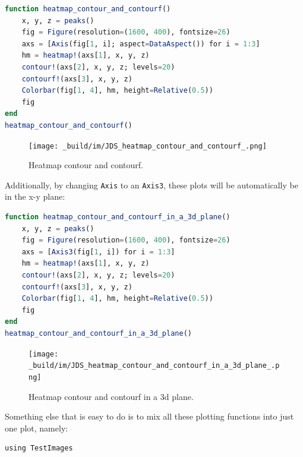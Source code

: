 \documentclass[
  notoc %
]{tufte-book}
\newcommand{\passthrough}[1]{#1}
\begin{document}
\begin{lstlisting}[language=Julia]
function heatmap_contour_and_contourf()
    x, y, z = peaks()
    fig = Figure(resolution=(1600, 400), fontsize=26)
    axs = [Axis(fig[1, i]; aspect=DataAspect()) for i = 1:3]
    hm = heatmap!(axs[1], x, y, z)
    contour!(axs[2], x, y, z; levels=20)
    contourf!(axs[3], x, y, z)
    Colorbar(fig[1, 4], hm, height=Relative(0.5))
    fig
end
heatmap_contour_and_contourf()
\end{lstlisting}

\begin{figure}
\hypertarget{fig:heatmap_contour_and_contourf}{%
\centering
\texttt{[image: \_build/im/JDS\_heatmap\_contour\_and\_contourf\_.png]}
\caption{Heatmap contour and
contourf.}\label{fig:heatmap_contour_and_contourf}
}
\end{figure}

Additionally, by changing \passthrough{\lstinline!Axis!} to an
\passthrough{\lstinline!Axis3!}, these plots will be automatically be in
the x-y plane:

\begin{lstlisting}[language=Julia]
function heatmap_contour_and_contourf_in_a_3d_plane()
    x, y, z = peaks()
    fig = Figure(resolution=(1600, 400), fontsize=26)
    axs = [Axis3(fig[1, i]) for i = 1:3]
    hm = heatmap!(axs[1], x, y, z)
    contour!(axs[2], x, y, z; levels=20)
    contourf!(axs[3], x, y, z)
    Colorbar(fig[1, 4], hm, height=Relative(0.5))
    fig
end
heatmap_contour_and_contourf_in_a_3d_plane()
\end{lstlisting}

\begin{figure}
\hypertarget{fig:heatmap_contour_and_contourf_in_a_3d_plane}{%
\centering
\texttt{[image: \_build/im/JDS\_heatmap\_contour\_and\_contourf\_in\_a\_3d\_plane\_.png]}
\caption{Heatmap contour and contourf in a 3d
plane.}\label{fig:heatmap_contour_and_contourf_in_a_3d_plane}
}
\end{figure}

Something else that is easy to do is to mix all these plotting functions
into just one plot, namely:

\begin{lstlisting}
using TestImages
\end{lstlisting}
\end{document}
